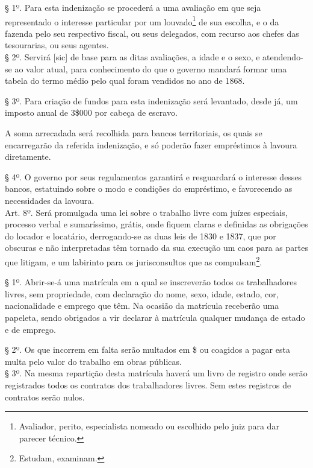§ 1º. Para esta indenização se procederá a uma avaliação em que seja
representado o interesse particular por um louvado\footnote{Avaliador,
  perito, especialista nomeado ou escolhido pelo juiz para dar parecer
  técnico.} de sua escolha, e o da fazenda pelo seu respectivo fiscal,
ou seus delegados, com recurso aos chefes das tesourarias, ou seus
agentes.\\
§ 2º. Servirá {[}sic{]} de base para as ditas avaliações, a idade e o
sexo, e atendendo-se ao valor atual, para conhecimento do que o governo
mandará formar uma tabela do termo médio pelo qual foram vendidos no ano
de 1868.

§ 3º. Para criação de fundos para esta indenização será levantado, desde
já, um imposto anual de 3\$000 por cabeça de escravo.

A soma arrecadada será recolhida para bancos territoriais, os quais se
encarregarão da referida indenização, e só poderão fazer empréstimos à
lavoura diretamente.

§ 4º. O governo por seus regulamentos garantirá e resguardará o
interesse desses bancos, estatuindo sobre o modo e condições do
empréstimo, e favorecendo as necessidades da lavoura.\\
Art. 8º. Será promulgada uma lei sobre o trabalho livre com juízes
especiais, processo verbal e sumaríssimo, grátis, onde fiquem claras e
definidas as obrigações do locador e locatário, derrogando-se as duas
leis de 1830 e 1837, que por obscuras e não interpretadas têm tornado da
sua execução um caos para as partes que litigam, e um labirinto para os
jurisconsultos que as compulsam\footnote{Estudam, examinam.}.

§ 1º. Abrir-se-á uma matrícula em a qual se inscreverão todos os
trabalhadores livres, sem propriedade, com declaração do nome, sexo,
idade, estado, cor, nacionalidade e emprego que têm. Na ocasião da
matrícula receberão uma papeleta, sendo obrigados a vir declarar à
matrícula qualquer mudança de estado e de emprego.

§ 2º. Os que incorrem em falta serão multados em \$ ou coagidos a pagar
esta multa pelo valor do trabalho em obras públicas.\\
§ 3º. Na mesma repartição desta matrícula haverá um livro de registro
onde serão registrados todos os contratos dos trabalhadores livres. Sem
estes registros de contratos serão nulos.

